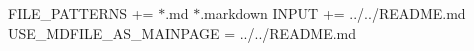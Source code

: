 F\+I\+L\+E\+\_\+\+P\+A\+T\+T\+E\+R\+NS += $\ast$.md $\ast$.markdown I\+N\+P\+UT += ../../\+R\+E\+A\+D\+ME.md U\+S\+E\+\_\+\+M\+D\+F\+I\+L\+E\+\_\+\+A\+S\+\_\+\+M\+A\+I\+N\+P\+A\+GE = ../../\+R\+E\+A\+D\+ME.md 